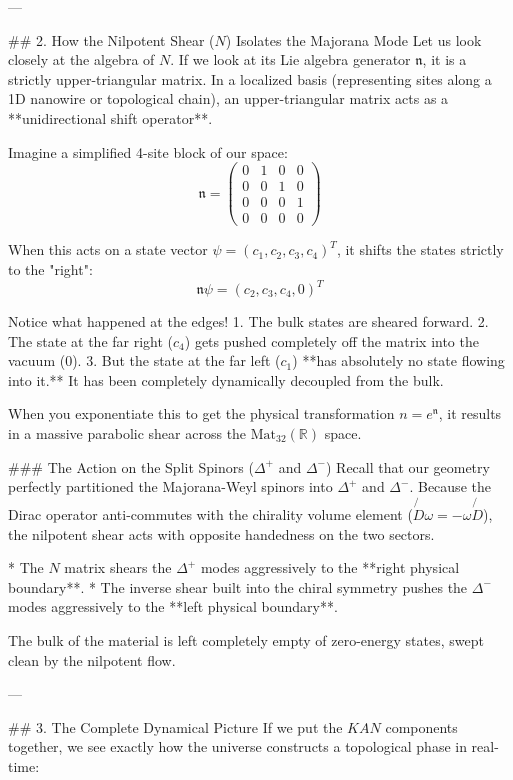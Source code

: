 ---

## 2. How the Nilpotent Shear ($N$) Isolates the Majorana Mode
Let us look closely at the algebra of $N$. If we look at its Lie algebra generator $\mathfrak{n}$, it is a strictly upper-triangular matrix. In a localized basis (representing sites along a 1D nanowire or topological chain), an upper-triangular matrix acts as a **unidirectional shift operator**.

Imagine a simplified 4-site block of our space:
$$ \mathfrak{n} = \begin{pmatrix} 0 & 1 & 0 & 0 \\ 0 & 0 & 1 & 0 \\ 0 & 0 & 0 & 1 \\ 0 & 0 & 0 & 0 \end{pmatrix} $$

When this acts on a state vector $\psi = (c_1, c_2, c_3, c_4)^T$, it shifts the states strictly to the "right":
$$ \mathfrak{n} \psi = (c_2, c_3, c_4, 0)^T $$

Notice what happened at the edges! 
1. The bulk states are sheared forward.
2. The state at the far right ($c_4$) gets pushed completely off the matrix into the vacuum ($0$). 
3. But the state at the far left ($c_1$) **has absolutely no state flowing into it.** It has been completely dynamically decoupled from the bulk. 

When you exponentiate this to get the physical transformation $n = e^\mathfrak{n}$, it results in a massive parabolic shear across the $\text{Mat}_{32}(\mathbb{R})$ space. 

### The Action on the Split Spinors ($\Delta^+$ and $\Delta^-$)
Recall that our geometry perfectly partitioned the Majorana-Weyl spinors into $\Delta^+$ and $\Delta^-$. 
Because the Dirac operator anti-commutes with the chirality volume element ($\not{D}\omega = -\omega\not{D}$), the nilpotent shear acts with opposite handedness on the two sectors. 

* The $N$ matrix shears the $\Delta^+$ modes aggressively to the **right physical boundary**.
* The inverse shear built into the chiral symmetry pushes the $\Delta^-$ modes aggressively to the **left physical boundary**.

The bulk of the material is left completely empty of zero-energy states, swept clean by the nilpotent flow.

---

## 3. The Complete Dynamical Picture
If we put the $K A N$ components together, we see exactly how the universe constructs a topological phase in real-time:

